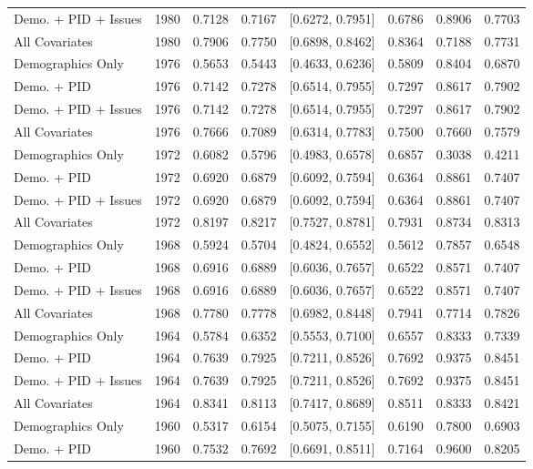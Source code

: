 \begin{longtable}{lrrrlrrr}
  Demo. + PID + Issues & 1980 & 0.7128 & 0.7167 & [0.6272, 0.7951] & 0.6786 & 0.8906 & 0.7703 \\ 
  All Covariates & 1980 & 0.7906 & 0.7750 & [0.6898, 0.8462] & 0.8364 & 0.7188 & 0.7731 \\ 
  Demographics Only & 1976 & 0.5653 & 0.5443 & [0.4633, 0.6236] & 0.5809 & 0.8404 & 0.6870 \\ 
  Demo. + PID & 1976 & 0.7142 & 0.7278 & [0.6514, 0.7955] & 0.7297 & 0.8617 & 0.7902 \\ 
  Demo. + PID + Issues & 1976 & 0.7142 & 0.7278 & [0.6514, 0.7955] & 0.7297 & 0.8617 & 0.7902 \\ 
  All Covariates & 1976 & 0.7666 & 0.7089 & [0.6314, 0.7783] & 0.7500 & 0.7660 & 0.7579 \\ 
  Demographics Only & 1972 & 0.6082 & 0.5796 & [0.4983, 0.6578] & 0.6857 & 0.3038 & 0.4211 \\ 
  Demo. + PID & 1972 & 0.6920 & 0.6879 & [0.6092, 0.7594] & 0.6364 & 0.8861 & 0.7407 \\ 
  Demo. + PID + Issues & 1972 & 0.6920 & 0.6879 & [0.6092, 0.7594] & 0.6364 & 0.8861 & 0.7407 \\ 
  All Covariates & 1972 & 0.8197 & 0.8217 & [0.7527, 0.8781] & 0.7931 & 0.8734 & 0.8313 \\ 
  Demographics Only & 1968 & 0.5924 & 0.5704 & [0.4824, 0.6552] & 0.5612 & 0.7857 & 0.6548 \\ 
  Demo. + PID & 1968 & 0.6916 & 0.6889 & [0.6036, 0.7657] & 0.6522 & 0.8571 & 0.7407 \\ 
  Demo. + PID + Issues & 1968 & 0.6916 & 0.6889 & [0.6036, 0.7657] & 0.6522 & 0.8571 & 0.7407 \\ 
  All Covariates & 1968 & 0.7780 & 0.7778 & [0.6982, 0.8448] & 0.7941 & 0.7714 & 0.7826 \\ 
  Demographics Only & 1964 & 0.5784 & 0.6352 & [0.5553, 0.7100] & 0.6557 & 0.8333 & 0.7339 \\ 
  Demo. + PID & 1964 & 0.7639 & 0.7925 & [0.7211, 0.8526] & 0.7692 & 0.9375 & 0.8451 \\ 
  Demo. + PID + Issues & 1964 & 0.7639 & 0.7925 & [0.7211, 0.8526] & 0.7692 & 0.9375 & 0.8451 \\ 
  All Covariates & 1964 & 0.8341 & 0.8113 & [0.7417, 0.8689] & 0.8511 & 0.8333 & 0.8421 \\ 
  Demographics Only & 1960 & 0.5317 & 0.6154 & [0.5075, 0.7155] & 0.6190 & 0.7800 & 0.6903 \\ 
  Demo. + PID & 1960 & 0.7532 & 0.7692 & [0.6691, 0.8511] & 0.7164 & 0.9600 & 0.8205 \\ 

\end{longtable}
